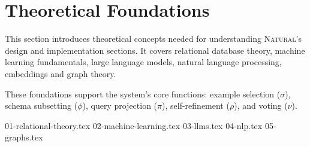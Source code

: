 \section{Theoretical Foundations}

This section introduces theoretical concepts needed for understanding
\textsc{Natural}'s design and implementation sections. It covers relational
database theory, machine learning fundamentals, large language models, natural
language processing, embeddings and graph theory.

These foundations support the system's core functions: example selection
($\sigma$), schema subsetting ($\phi$), query projection ($\pi$),
self-refinement ($\rho$), and voting ($\nu$).

{01-relational-theory.tex}
{02-machine-learning.tex}
{03-llms.tex}
{04-nlp.tex}
{05-graphs.tex}
